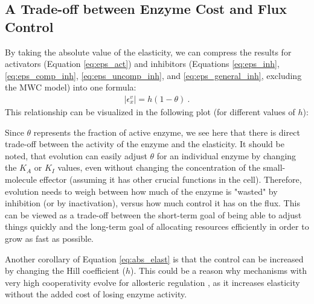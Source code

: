 \documentclass[12pt,a4paper]{article}
\begin{document}
\subsection{A Trade-off between Enzyme Cost and Flux Control}
By taking the absolute value of the elasticity, we can compress the results for activators (Equation \ref{eq:eps_act}) and inhibitors (Equations \ref{eq:eps_inh}, \ref{eq:eps_comp_inh}, \ref{eq:eps_uncomp_inh}, and \ref{eq:eps_general_inh}, excluding the MWC model) into one formula:
\begin{eqnarray}
|\epsilon_x^v| = h (1 - \theta)~. \label{eq:abs_elast}
\end{eqnarray}
This relationship can be visualized in the following plot (for different values of $h$):
\begin{center}
\end{center}

Since $\theta$ represents the fraction of active enzyme, we see here that there is direct trade-off between the activity of the enzyme and the elasticity. It should be noted, that evolution can easily adjust $\theta$ for an individual enzyme by changing the $K_A$ or $K_I$ values, even without changing the concentration of the small-molecule effector (assuming it has other crucial functions in the cell). Therefore, evolution needs to weigh between how much of the enzyme is "wasted" by inhibition (or by inactivation), versus how much control it has on the flux. This can be viewed as a trade-off between the short-term goal of being able to adjust things quickly and the long-term goal of allocating resources efficiently in order to grow as fast as possible.

Another corollary of Equation \ref{eq:abs_elast} is that the control can be increased by changing the Hill coefficient ($h$). This could be a reason why mechanisms with very high cooperativity evolve for allosteric regulation \cite{Monod1965-dq}, as it increases elasticity without the added cost of losing enzyme activity.




\end{document}
